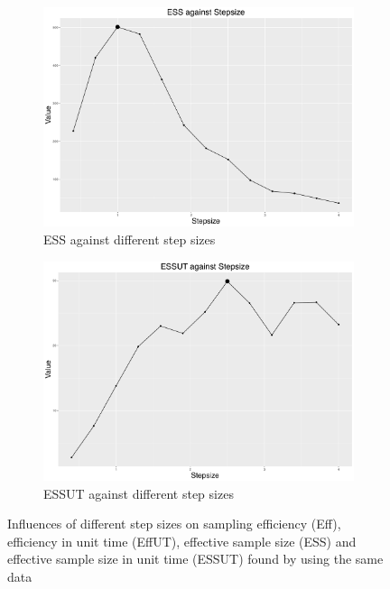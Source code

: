 \begin{figure}[h]
\begin{subfigure}[t]{0.45\textwidth}
	\includegraphics[width=\textwidth]{Chapters/05MCMCOU/plots/ggess.pdf}
	\caption{ESS against different step sizes}
\end{subfigure}
\begin{subfigure}[t]{0.45\textwidth}
	\includegraphics[width=\textwidth]{Chapters/05MCMCOU/plots/ggessut.pdf}
	\caption{ESSUT against different step sizes}
\end{subfigure}
\caption{Influences of different step sizes on sampling efficiency (Eff), efficiency in unit time (EffUT), effective sample size (ESS) and effective sample size in unit time (ESSUT) found by using the same data}
\label{effeutessessutexamplefigure}
\end{figure}


